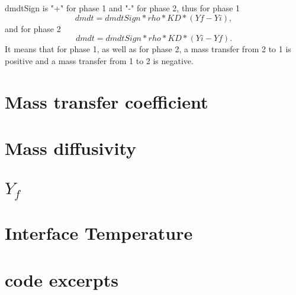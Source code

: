 \documentclass[a4paper, 12 pt, fleqn]{article}
\begin{document}
dmdtSign is "+" for phase 1 and "-" for phase 2, thus for phase 1
\begin{equation}
dmdt = dmdtSign*rho*KD*( Yf - Yi ),
\end{equation}
and for phase 2
\begin{equation}
dmdt = dmdtSign*rho*KD*( Yi - Yf ).
\end{equation}
It means that for phase 1, as well as for phase 2, a mass transfer from 2 to 1 is positive and a mass transfer from 1 to 2 is negative.

\section{Mass transfer coefficient}

\section{Mass diffusivity}

\section{$Y_f$}


\section{Interface Temperature}


\section{code excerpts}


\end{document}
